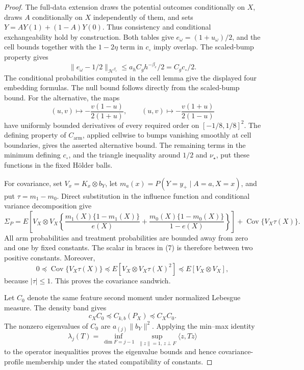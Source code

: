 \documentclass{article}
\begin{document}
\begin{proof}
The full-data extension draws the potential outcomes conditionally on \(X\), draws \(A\) conditionally on \(X\) independently of them, and sets \(Y=AY(1)+(1-A)Y(0)\). Thus consistency and conditional exchangeability hold by construction. Both tables give \(e_\omega=(1+u_\omega)/2\), and the cell bounds together with the \(1-2\eta\) term in \(c_\circ\) imply overlap. The scaled-bump property gives
\[
\|e_\omega-1/2\|_{\mathcal H^{\beta_e}}
\le a_hC_gh^{-\beta_e}/2=C_gc_\circ/2.
\]
The conditional probabilities computed in the cell lemma give the displayed four embedding formulas. The null bound follows directly from the scaled-bump bound. For the alternative, the maps
\[
(u,v)\mapsto-\frac{v(1-u)}{2(1+u)},\qquad
(u,v)\mapsto-\frac{v(1+u)}{2(1-u)}
\]
have uniformly bounded derivatives of every required order on \([-1/8,1/8]^2\). The defining property of \(C_{\mathrm{arm}}\), applied cellwise to bumps vanishing smoothly at cell boundaries, gives the asserted alternative bound. The remaining terms in the minimum defining \(c_\circ\), and the triangle inequality around \(1/2\) and \(\nu_\star\), put these functions in the fixed Hölder balls.

For covariance, set \(V_x=K_x\otimes b_Y\), let \(m_a(x)=P(Y=y_+\mid A=a,X=x)\), and put \(\tau=m_1-m_0\). Direct substitution in the influence function and conditional variance decomposition give
\[
\Sigma_P
=E\left[V_X\otimes V_X\left\{
\frac{m_1(X)\{1-m_1(X)\}}{e(X)}
+\frac{m_0(X)\{1-m_0(X)\}}{1-e(X)}\right\}\right]
+\operatorname{Cov}\{V_X\tau(X)\}. \tag{7}
\]
All arm probabilities and treatment probabilities are bounded away from zero and one by fixed constants. The scalar in braces in (7) is therefore between two positive constants. Moreover,
\[
0\preceq\operatorname{Cov}\{V_X\tau(X)\}
\preceq E[V_X\otimes V_X\tau(X)^2]
\preceq E[V_X\otimes V_X],
\]
because \(|\tau|\le1\). This proves the covariance sandwich.

Let \(C_0\) denote the same feature second moment under normalized Lebesgue measure. The density band gives
\[
c_XC_0\preceq C_{k,b}(P_X)\preceq C_XC_0.
\]
The nonzero eigenvalues of \(C_0\) are \(a_{(j)}\|b_Y\|^2\). Applying the min--max identity
\[
\lambda_j(T)=\inf_{\dim F=j-1}\sup_{\|z\|=1,\,z\perp F}\langle z,Tz\rangle
\]
to the operator inequalities proves the eigenvalue bounds and hence covariance-profile membership under the stated compatibility of constants.


\end{proof}
\end{document}
